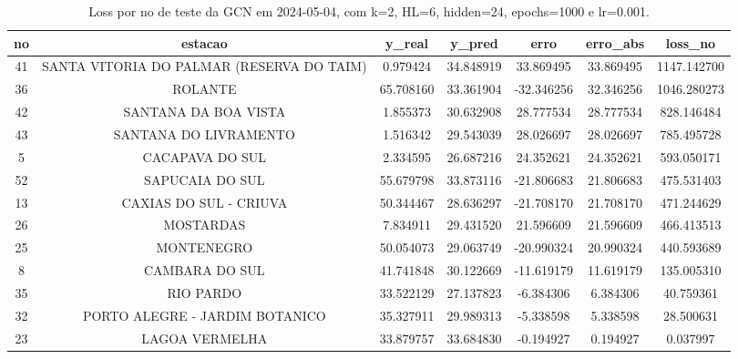\begin{table}[h]
\centering
\caption{Loss por no de teste da GCN em 2024-05-04, com k=2, HL=6, hidden=24, epochs=1000 e lr=0.001.}
\label{tab:gcn_loss_k2_hl6_h24_e1000_d20240504}
\begin{tabular}{ccccccc}
\toprule
no & estacao & y\_real & y\_pred & erro & erro\_abs & loss\_no \\
\midrule
41 & SANTA VITORIA DO PALMAR (RESERVA DO TAIM) & 0.979424 & 34.848919 & 33.869495 & 33.869495 & 1147.142700 \\
36 & ROLANTE & 65.708160 & 33.361904 & -32.346256 & 32.346256 & 1046.280273 \\
42 & SANTANA DA BOA VISTA & 1.855373 & 30.632908 & 28.777534 & 28.777534 & 828.146484 \\
43 & SANTANA DO LIVRAMENTO & 1.516342 & 29.543039 & 28.026697 & 28.026697 & 785.495728 \\
5 & CACAPAVA DO SUL & 2.334595 & 26.687216 & 24.352621 & 24.352621 & 593.050171 \\
52 & SAPUCAIA DO SUL & 55.679798 & 33.873116 & -21.806683 & 21.806683 & 475.531403 \\
13 & CAXIAS DO SUL - CRIUVA & 50.344467 & 28.636297 & -21.708170 & 21.708170 & 471.244629 \\
26 & MOSTARDAS & 7.834911 & 29.431520 & 21.596609 & 21.596609 & 466.413513 \\
25 & MONTENEGRO & 50.054073 & 29.063749 & -20.990324 & 20.990324 & 440.593689 \\
8 & CAMBARA DO SUL & 41.741848 & 30.122669 & -11.619179 & 11.619179 & 135.005310 \\
35 & RIO PARDO & 33.522129 & 27.137823 & -6.384306 & 6.384306 & 40.759361 \\
32 & PORTO ALEGRE - JARDIM BOTANICO & 35.327911 & 29.989313 & -5.338598 & 5.338598 & 28.500631 \\
23 & LAGOA VERMELHA & 33.879757 & 33.684830 & -0.194927 & 0.194927 & 0.037997 \\
\bottomrule
\end{tabular}
\end{table}
